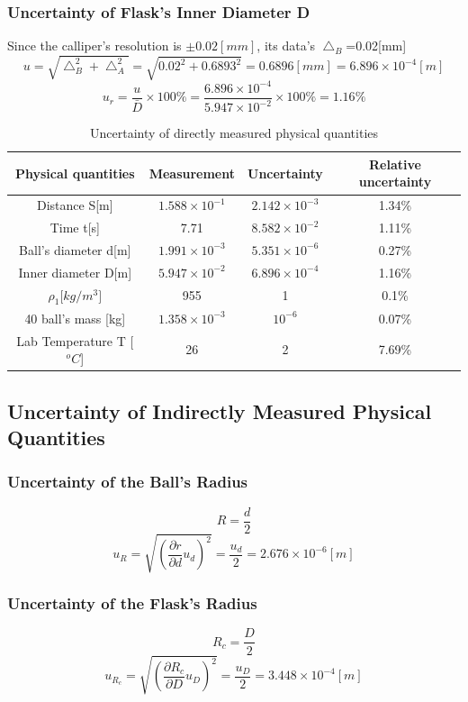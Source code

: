 \documentclass[12pt]{article}
\begin{document}
\subsubsection{Uncertainty of Flask's Inner Diameter D}
Since the calliper's resolution is $\pm0.02[mm]$, its data's $\bigtriangleup_B$=0.02[mm]
$$u=\sqrt{\bigtriangleup_B^2+\bigtriangleup_A^2}=\sqrt{0.02^2+0.6893^2}=0.6896[mm]=6.896\times10^{-4}[m]$$ 
$$u_r=\frac{u}{\bar{D}}\times100\%=\frac{6.896\times10^{-4}}{5.947\times10^{-2}}\times100\%=1.16\%$$
\begin{table}[]
\centering
\begin{tabular}{|c|c|c|c|}
\hline
Physical quantities      & Measurement &Uncertainty & Relative uncertainty      \\ \hline
Distance S{[}m{]}        &  $1.588\times10^{-1}$     &$2.142\times10^{-3}$   & 1.34\% \\ \hline
Time t{[}s{]}            & 7.71  & $8.582\times10^{-2}$  & 1.11\% \\ \hline
Ball's diameter d{[}m{]} &  $1.991\times10^{-3}$     & $5.351\times10^{-6}$  & 0.27\% \\ \hline
Inner diameter D{[}m{]}  &  $5.947\times10^{-2}$     & $6.896\times10^{-4}$  & 1.16\% \\ \hline
$\rho_1{[}kg/m^3{]}$                       &  955     &  1 & 0.1\%  \\ \hline
40 ball's mass {[}kg{]}         &   $1.358\times10^{-3}$    &  $10^{-6}$ & 0.07\% \\ \hline
Lab Temperature T {[}$^oC${]}       & 26    & 2 & 7.69\% \\ \hline
\end{tabular}
\caption{Uncertainty of directly measured physical quantities}
\end{table}
\subsection{Uncertainty of Indirectly Measured Physical Quantities}
\subsubsection{Uncertainty of the Ball's Radius}
$$R=\frac{d}{2}$$
$$u_R=\sqrt{(\frac{\partial{r}}{\partial{d}}u_d)^2}=\frac{u_d}{2}=2.676\times10^{-6}[m]$$
\subsubsection{Uncertainty of the Flask's Radius}
$$R_c=\frac{D}{2}$$
$$u_{R_c}=\sqrt{(\frac{\partial{R_c}}{\partial{D}}u_D)^2}=\frac{u_D}{2}=3.448\times10^{-4}[m]$$
\end{document}

